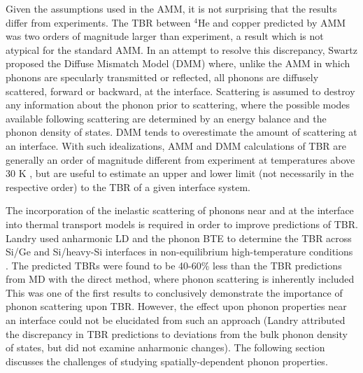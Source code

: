 \documentclass[aps,prb,preprint,preprintnumbers,amsmath,amssymb,floatfix,superscriptaddress]{revtex4}
\begin{document}
Given the assumptions used in the AMM, it is not surprising that the results differ from experiments. The TBR between $^4$He and copper predicted by AMM was two orders of magnitude larger than experiment, a result which is not atypical for the standard AMM. In an attempt to resolve this discrepancy, Swartz proposed the Diffuse Mismatch Model (DMM) where, unlike the AMM in which phonons are specularly transmitted or reflected, all phonons are diffusely scattered, forward or backward, at the interface. Scattering is assumed to destroy any information about the phonon prior to scattering, where the possible modes available following scattering are determined by an energy balance and the phonon density of states. DMM tends to overestimate the amount of scattering at an interface. With such idealizations, AMM and DMM calculations of TBR are generally an order of magnitude different from experiment at temperatures above 30 K \cite{landrythesis}, but are useful to estimate an upper and lower limit (not necessarily in the respective order) to the TBR of a given interface system.

The incorporation of the inelastic scattering of phonons near and at the interface  into thermal transport models is required in order to improve predictions of TBR. Landry used anharmonic LD and the phonon BTE to determine the TBR across Si/Ge and Si/heavy-Si interfaces in non-equilibrium high-temperature conditions \cite{landrythesis}. The predicted TBRs were found to be 40-60\% less than the TBR predictions from MD with the direct method, where phonon scattering is inherently included This was one of the first results to conclusively demonstrate the importance of phonon scattering upon TBR. However, the effect upon phonon properties near an interface could not be elucidated from such an approach (Landry attributed the discrepancy in TBR predictions to deviations from the bulk phonon density of states, but did not examine anharmonic changes). The following section discusses the challenges of studying spatially-dependent phonon properties.
\end{document}
